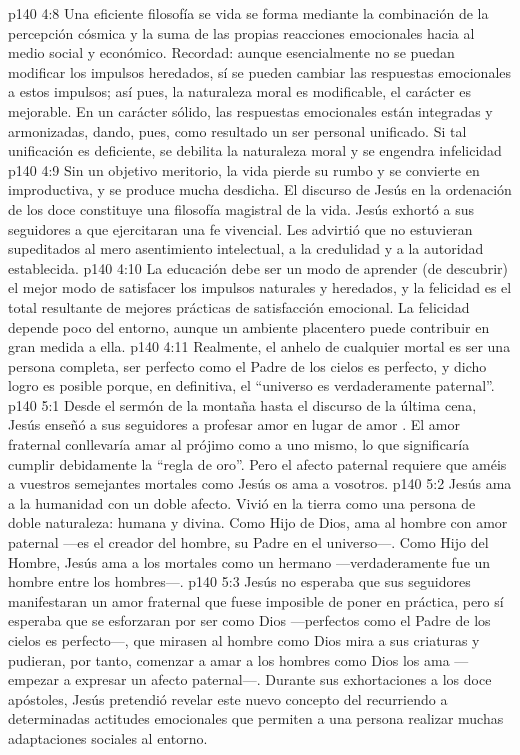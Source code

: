 \vs p140 4:8 \pc Una eficiente filosofía se vida se forma mediante la combinación de la percepción cósmica y la suma de las propias reacciones emocionales hacia al medio social y económico. Recordad: aunque esencialmente no se puedan modificar los impulsos heredados, sí se pueden cambiar las respuestas emocionales a estos impulsos; así pues, la naturaleza moral es modificable, el carácter es mejorable. En un carácter sólido, las respuestas emocionales están integradas y armonizadas, dando, pues, como resultado un ser personal unificado. Si tal unificación es deficiente, se debilita la naturaleza moral y se engendra infelicidad
\vs p140 4:9 Sin un objetivo meritorio, la vida pierde su rumbo y se convierte en improductiva, y se produce mucha desdicha. El discurso de Jesús en la ordenación de los doce constituye una filosofía magistral de la vida. Jesús exhortó a sus seguidores a que ejercitaran una fe vivencial. Les advirtió que no estuvieran supeditados al mero asentimiento intelectual, a la credulidad y a la autoridad establecida.
\vs p140 4:10 La educación debe ser un modo de aprender (de descubrir) el mejor modo de satisfacer los impulsos naturales y heredados, y la felicidad es el total resultante de mejores prácticas de satisfacción emocional. La felicidad depende poco del entorno, aunque un ambiente placentero puede contribuir en gran medida a ella.
\vs p140 4:11 \pc Realmente, el anhelo de cualquier mortal es ser una persona completa, ser perfecto como el Padre de los cielos es perfecto, y dicho logro es posible porque, en definitiva, el “universo es verdaderamente paternal”.
\vs p140 5:1 Desde el sermón de la montaña hasta el discurso de la última cena, Jesús enseñó a sus seguidores a profesar amor  en lugar de amor . El amor fraternal conllevaría amar al prójimo como a uno mismo, lo que significaría cumplir debidamente la “regla de oro”. Pero el afecto paternal requiere que améis a vuestros semejantes mortales como Jesús os ama a vosotros.
\vs p140 5:2 Jesús ama a la humanidad con un doble afecto. Vivió en la tierra como una persona de doble naturaleza: humana y divina. Como Hijo de Dios, ama al hombre con amor paternal ---es el creador del hombre, su Padre en el universo---. Como Hijo del Hombre, Jesús ama a los mortales como un hermano ---verdaderamente fue un hombre entre los hombres---.
\vs p140 5:3 Jesús no esperaba que sus seguidores manifestaran un amor fraternal que fuese imposible de poner en práctica, pero sí esperaba que se esforzaran por ser como Dios ---perfectos como el Padre de los cielos es perfecto---, que mirasen al hombre como Dios mira a sus criaturas y pudieran, por tanto, comenzar a amar a los hombres como Dios los ama ---empezar a expresar un afecto paternal---. Durante sus exhortaciones a los doce apóstoles, Jesús pretendió revelar este nuevo concepto del  recurriendo a determinadas actitudes emocionales que permiten a una persona realizar muchas adaptaciones sociales al entorno.
